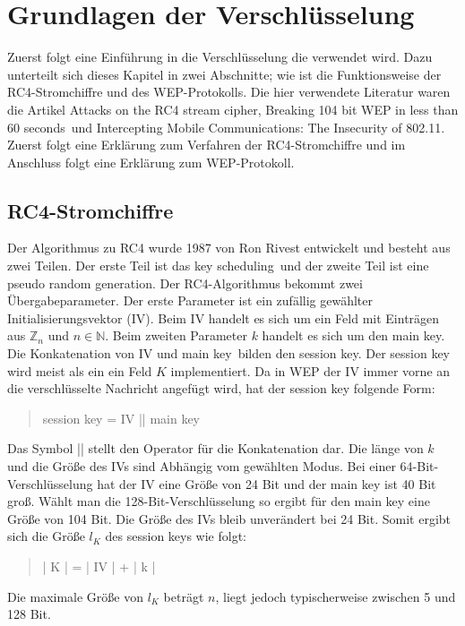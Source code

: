 \documentclass[10pt,a4paper]{article}
\begin{document}
\section{Grundlagen der Verschlüsselung}
Zuerst folgt eine Einführung in die Verschlüsselung die verwendet wird. Dazu unterteilt sich dieses Kapitel in zwei Abschnitte; wie ist die Funktionsweise der RC4-Stromchiffre und des WEP-Protokolls. Die hier verwendete Literatur waren die Artikel \glqq Attacks on the RC4 stream cipher\grqq, \glqq Breaking 104 bit WEP in less than 60 seconds\grqq \ und \glqq Intercepting Mobile Communications: The Insecurity of 802.11\grqq. Zuerst folgt eine Erklärung zum Verfahren der RC4-Stromchiffre und im Anschluss folgt eine Erklärung zum WEP-Protokoll.

\subsection{RC4-Stromchiffre}
Der Algorithmus zu RC4 wurde 1987 von Ron Rivest entwickelt und besteht aus zwei Teilen. Der erste Teil ist das \glqq key scheduling\grqq \ und der zweite Teil ist eine \glqq pseudo random generation\grqq. Der RC4-Algorithmus bekommt zwei Übergabeparameter. Der erste Parameter ist ein zufällig gewählter Initialisierungsvektor (IV). Beim IV handelt es sich um ein Feld mit Einträgen aus $\mathbb{Z}_n$ und $n \in \mathbb{N}$. Beim zweiten Parameter $k$ handelt es sich um den \glqq main key\grqq. Die Konkatenation von IV und \glqq main key\grqq \ bilden den session key. Der session key wird meist als ein ein Feld $K$ implementiert. Da in WEP der IV immer vorne an die verschlüsselte Nachricht angefügt wird, hat der session key folgende Form:
\begin{quote}
	session key = IV || main key
\end{quote}
Das Symbol || stellt den Operator für die Konkatenation dar. Die länge von $k$ und die Größe des IVs sind Abhängig vom gewählten Modus. Bei einer 64-Bit-Verschlüsselung hat der IV eine Größe von 24 Bit und der main key ist 40 Bit groß. Wählt man die 128-Bit-Verschlüsselung so ergibt für den main key eine Größe von 104 Bit. Die Größe des IVs bleib unverändert bei 24 Bit. Somit ergibt sich die Größe $l_K$ des session keys wie folgt:
\begin{quote}
	| K | = | IV | + | k |
\end{quote}
Die maximale Größe von $l_K$ beträgt $n$, liegt jedoch typischerweise zwischen 5 und 128 Bit.
\end{document}
